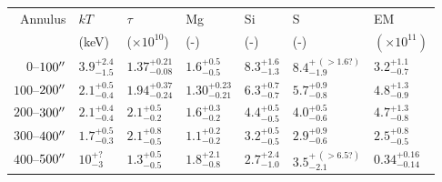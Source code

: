 \begin{tabular}{@{}rllllll@{}}
\toprule
Annulus & $kT$ & $\tau$ & Mg & Si & S & EM \\
 & (keV) & ($\times 10^{10}$) & (-) & (-) & (-) & $(\times 10^{11})$ \\
\midrule
  $0$--$100\mbox{$^{\prime\prime}$}$ & ${3.9}^{+2.4}_{-1.5}$ & ${1.37}^{+0.21}_{-0.08}$ & ${1.6}^{+0.5}_{-0.5}$ & ${8.3}^{+1.6}_{-1.3}$ & ${8.4}^{+\,(>1.6?)}_{-1.9}$ & ${3.2}^{+1.1}_{-0.7}$ \\
$100$--$200\mbox{$^{\prime\prime}$}$ & ${2.1}^{+0.5}_{-0.4}$ & ${1.94}^{+0.37}_{-0.24}$ & ${1.30}^{+0.23}_{-0.21}$ & ${6.3}^{+0.7}_{-0.7}$ & ${5.7}^{+0.9}_{-0.8}$ & ${4.8}^{+1.3}_{-0.9}$ \\
$200$--$300\mbox{$^{\prime\prime}$}$ & ${2.1}^{+0.4}_{-0.4}$ & ${2.1}^{+0.5}_{-0.2}$ & ${1.6}^{+0.3}_{-0.2}$ & ${4.4}^{+0.5}_{-0.5}$ & ${4.0}^{+0.5}_{-0.6}$ & ${4.7}^{+1.3}_{-0.8}$ \\
$300$--$400\mbox{$^{\prime\prime}$}$ & ${1.7}^{+0.5}_{-0.3}$ & ${2.1}^{+0.8}_{-0.5}$ & ${1.1}^{+0.2}_{-0.2}$ & ${3.2}^{+0.5}_{-0.5}$ & ${2.9}^{+0.9}_{-0.6}$ & ${2.5}^{+0.8}_{-0.5}$ \\
$400$--$500\mbox{$^{\prime\prime}$}$ & ${10}^{+?}_{-3}$ & ${1.3}^{+0.5}_{-0.5}$ & ${1.8}^{+2.1}_{-0.8}$ & ${2.7}^{+2.4}_{-1.0}$ & ${3.5}^{+\,(>6.5?)}_{-2.1}$ & ${0.34}^{+0.16}_{-0.14}$ \\
\bottomrule
\end{tabular}
